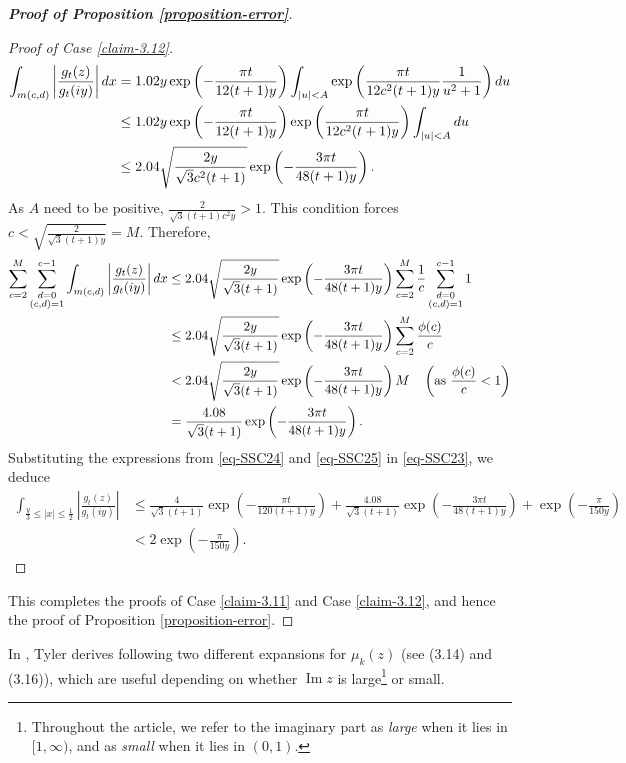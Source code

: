 \documentclass[11pt]{amsart}
\theoremstyle{plain}
\renewcommand{\Im}{\operatorname{Im}}
\numberwithin{equation}{section}
\begin{document}
\begin{proof}[\textbf{\boldmath Proof of Proposition \ref{proposition-error}}]
\begin{proof}[Proof of Case \ref{claim-3.12}]
\begin{align*}
				\notag
				\int_{m(c,d)}\left|\frac{g_{t}(z)}{g_t(iy)}\right|dx&= 1.02y\exp\left(-\frac{\pi t}{12(t+1)y}\right) \int_{|u|<A}\exp\left(\frac{\pi t}{12c^{2}(t+1)y}\frac{1}{u^{2}+1}\right)du\\
				\notag
				&\le1.02 y\exp\left(-\frac{\pi t}{12(t+1)y}\right)\exp\left(\frac{\pi t}{12c^{2}(t+1)y}\right) \int_{|u|<A}du\\
				&\le 2.04 \sqrt{\frac{2y}{\sqrt{3}c^{2}(t+1)}} \exp\left(-\frac{3\pi t}{48(t+1)y}\right).
			\end{align*}
			As $A$ need to be positive, $\frac{2}{\sqrt{3}(t+1)c^{2}y}>1$. This condition forces $c<\sqrt{\frac{2}{\sqrt{3}(t+1)y}}=M$. Therefore,
			\begin{align}\label{eq-SSC25}
				\notag
				\sum_{c=2}^{M}\sum_{\substack{d=0\\(c,d)=1}}^{c-1}\int_{m(c,d)}\left|\frac{g_{t}(z)}{g_t(iy)}\right|dx &\le  2.04 \sqrt{\frac{2y}{\sqrt{3}(t+1)}} \exp\left(-\frac{3\pi t}{48(t+1)y}\right) \sum_{c=2}^{M}\frac{1}{c} \sum_{\substack{d=0\\(c,d)=1}}^{c-1}1\\
				\notag
				&\le  2.04 \sqrt{\frac{2y}{\sqrt{3}(t+1)}} \exp\left(-\frac{3\pi t}{48(t+1)y}\right) \sum_{c=2}^{M}\frac{\phi(c)}{c}\\
				\notag
				&<  2.04 \sqrt{\frac{2y}{\sqrt{3}(t+1)}} \exp\left(-\frac{3\pi t}{48(t+1)y}\right)M\quad\left(\text{as $\frac{\phi(c)}{c}<1$}\right)\\
				&=   \frac{4.08}{\sqrt{3}(t+1)} \exp\left(-\frac{3\pi t}{48(t+1)y}\right).
			\end{align}
			\newline
			Substituting the expressions from \eqref{eq-SSC24} and \eqref{eq-SSC25} in \eqref{eq-SSC23}, we deduce
			\begin{align*}
				\int_{\frac{y}{3}\le|x|\le \frac{1}{2}}\left|\frac{g_{t}(z)}{g_t(iy)}\right| &\le  \frac{4}{\sqrt{3}(t+1)}\exp\left(-\frac{\pi t}{120(t+1)y}\right)+\frac{4.08}{\sqrt{3}(t+1)} \exp\left(-\frac{3\pi t}{48(t+1)y}\right)+\exp\left(-\frac{\pi}{150y}\right)\\
				&<2\exp\left(-\frac{\pi}{150y}\right).
			\end{align*}
		\end{proof}
		This completes the proofs of Case \ref{claim-3.11} and Case \ref{claim-3.12}, and hence the proof of Proposition \ref{proposition-error}.      
	\end{proof}
	In \cite{tyler2024asymptotics}, Tyler derives following two different expansions for $\mu_k(z)$ (see (3.14) and (3.16)), which are useful depending on whether $\Im z$ is large\footnote{Throughout the article, we refer to the imaginary part as \emph{large} when it lies in $[1,\infty)$, and as \emph{small} when it lies in $(0,1)$.} or small.
\end{document}
